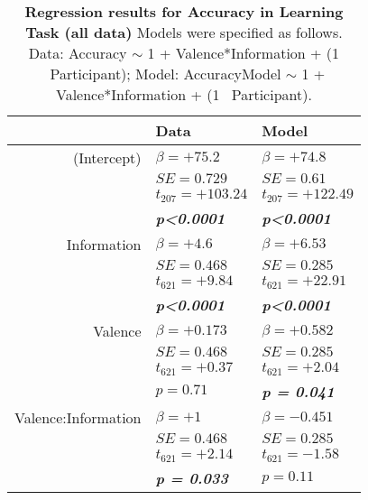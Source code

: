 % 
% 
\begin{table}
\centering \footnotesize
\begin{tabular}{r|ll}
\hline \hline
& \textbf{Data}& \textbf{Model} \\
\hline
\hline (Intercept)&$\beta=+75.2$&$\beta=+74.8$\\
&$SE=0.729$&$SE=0.61$\\
&$t_{207}=+103.24$&$t_{207}=+122.49$\\
&\textbf{\textit{p\textless0.0001}}&\textbf{\textit{p\textless0.0001}}\\
\hline Information&$\beta=+4.6$&$\beta=+6.53$\\
&$SE=0.468$&$SE=0.285$\\
&$t_{621}=+9.84$&$t_{621}=+22.91$\\
&\textbf{\textit{p\textless0.0001}}&\textbf{\textit{p\textless0.0001}}\\
\hline Valence&$\beta=+0.173$&$\beta=+0.582$\\
&$SE=0.468$&$SE=0.285$\\
&$t_{621}=+0.37$&$t_{621}=+2.04$\\
&$p=0.71$&\textbf{\textit{p = 0.041}}\\
\hline Valence:Information&$\beta=+1$&$\beta=-0.451$\\
&$SE=0.468$&$SE=0.285$\\
&$t_{621}=+2.14$&$t_{621}=-1.58$\\
&\textbf{\textit{p = 0.033}}&$p=0.11$\\
\hline \hline
\end{tabular}
\caption{\textbf{Regression results for Accuracy in Learning Task (all data)} Models were specified as follows. Data: Accuracy $\sim$ 1 + Valence*Information + (1 \textbar \ Participant); Model: AccuracyModel $\sim$ 1 + Valence*Information + (1 \textbar \ Participant).}
\label{tab:regAccuracy_allexp}
\end{table}
% 
% 
